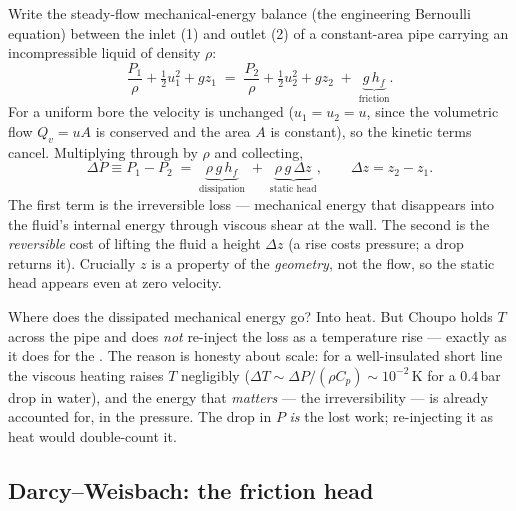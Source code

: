 \documentclass[11pt,a4paper]{article}
\begin{document}
Write the steady-flow mechanical-energy balance (the engineering Bernoulli
equation) between the inlet (1) and outlet (2) of a constant-area pipe
carrying an incompressible liquid of density $\rho$:
\begin{equation}
   \frac{P_1}{\rho} + \tfrac12 u_1^2 + g z_1
   \;=\;
   \frac{P_2}{\rho} + \tfrac12 u_2^2 + g z_2
   \;+\; \underbrace{g\,h_f}_{\text{friction}} .
\end{equation}
For a uniform bore the velocity is unchanged ($u_1=u_2=u$, since the
volumetric flow $Q_v=uA$ is conserved and the area $A$ is constant), so the
kinetic terms cancel.  Multiplying through by $\rho$ and collecting,
\begin{equation}
   \boxed{\;
   \Delta P \equiv P_1 - P_2
   \;=\; \underbrace{\rho\,g\,h_f}_{\text{dissipation}}
       \;+\; \underbrace{\rho\,g\,\Delta z}_{\text{static head}},
   \qquad \Delta z = z_2 - z_1 .
   \;}
   \label{eq:pipe-mech}
\end{equation}
The first term is the irreversible loss --- mechanical energy that
disappears into the fluid's internal energy through viscous shear at the
wall.  The second is the \emph{reversible} cost of lifting the fluid a
height $\Delta z$ (a rise costs pressure; a drop returns it).  Crucially
$z$ is a property of the \emph{geometry}, not the flow, so the static head
appears even at zero velocity.

\begin{intuition}
Where does the dissipated mechanical energy go?  Into heat.  But Choupo
holds $T$ across the pipe and does \emph{not} re-inject the loss as a
temperature rise --- exactly as it does for the .  The reason
is honesty about scale: for a well-insulated short line the viscous heating
raises $T$ negligibly ($\Delta T \sim \Delta P/(\rho C_p) \sim 10^{-2}$\,K
for a $0.4$\,bar drop in water), and the energy that \emph{matters} --- the
irreversibility --- is already accounted for, in the pressure.  The drop in
$P$ \emph{is} the lost work; re-injecting it as heat would double-count it.
\end{intuition}

\subsection{Darcy--Weisbach: the friction head}
\end{document}
